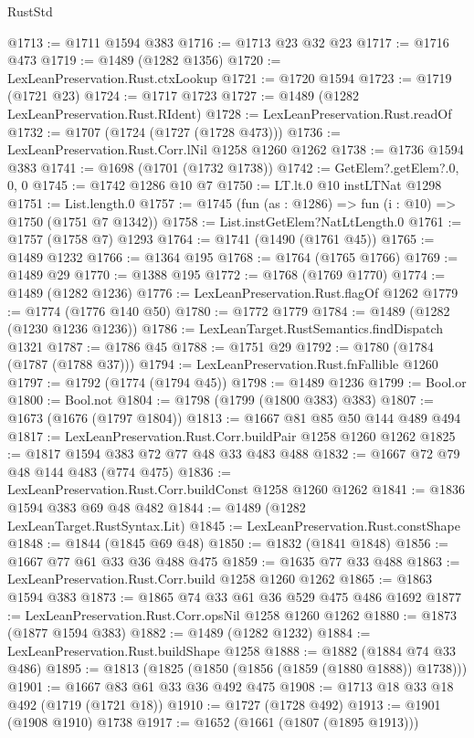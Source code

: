 \begin{lexlean}{RustStd}
\begin{coremodule}
{\begin{coremodule}
{{{{{{{{{{{{@1713 := @1711 @1594 @383
@1716 := @1713 @23 @32 @23
@1717 := @1716 @473
@1719 := @1489 (@1282 @1356)
@1720 := LexLeanPreservation.Rust.ctxLookup
@1721 := @1720 @1594
@1723 := @1719 (@1721 @23)
@1724 := @1717 @1723
@1727 := @1489 (@1282 LexLeanPreservation.Rust.RIdent)
@1728 := LexLeanPreservation.Rust.readOf
@1732 := @1707 (@1724 (@1727 (@1728 @473)))
@1736 := LexLeanPreservation.Rust.Corr.lNil @1258 @1260 @1262
@1738 := @1736 @1594 @383
@1741 := @1698 (@1701 (@1732 @1738))
@1742 := GetElem?.getElem?.{0, 0, 0}
@1745 := @1742 @1286 @10 @7
@1750 := LT.lt.{0} @10 instLTNat @1298
@1751 := List.length.{0}
@1757 := @1745 (fun (as : @1286) => fun (i : @10) => @1750 (@1751 @7 @1342))
@1758 := List.instGetElem?NatLtLength.{0}
@1761 := @1757 (@1758 @7) @1293
@1764 := @1741 (@1490 (@1761 @45))
@1765 := @1489 @1232
@1766 := @1364 @195
@1768 := @1764 (@1765 @1766)
@1769 := @1489 @29
@1770 := @1388 @195
@1772 := @1768 (@1769 @1770)
@1774 := @1489 (@1282 @1236)
@1776 := LexLeanPreservation.Rust.flagOf @1262
@1779 := @1774 (@1776 @140 @50)
@1780 := @1772 @1779
@1784 := @1489 (@1282 (@1230 @1236 @1236))
@1786 := LexLeanTarget.RustSemantics.findDispatch @1321
@1787 := @1786 @45
@1788 := @1751 @29
@1792 := @1780 (@1784 (@1787 (@1788 @37)))
@1794 := LexLeanPreservation.Rust.fnFallible @1260
@1797 := @1792 (@1774 (@1794 @45))
@1798 := @1489 @1236
@1799 := Bool.or
@1800 := Bool.not
@1804 := @1798 (@1799 (@1800 @383) @383)
@1807 := @1673 (@1676 (@1797 @1804))
@1813 := @1667 @81 @85 @50 @144 @489 @494
@1817 := LexLeanPreservation.Rust.Corr.buildPair @1258 @1260 @1262
@1825 := @1817 @1594 @383 @72 @77 @48 @33 @483 @488
@1832 := @1667 @72 @79 @48 @144 @483 (@774 @475)
@1836 := LexLeanPreservation.Rust.Corr.buildConst @1258 @1260 @1262
@1841 := @1836 @1594 @383 @69 @48 @482
@1844 := @1489 (@1282 LexLeanTarget.RustSyntax.Lit)
@1845 := LexLeanPreservation.Rust.constShape
@1848 := @1844 (@1845 @69 @48)
@1850 := @1832 (@1841 @1848)
@1856 := @1667 @77 @61 @33 @36 @488 @475
@1859 := @1635 @77 @33 @488
@1863 := LexLeanPreservation.Rust.Corr.build @1258 @1260 @1262
@1865 := @1863 @1594 @383
@1873 := @1865 @74 @33 @61 @36 @529 @475 @486 @1692
@1877 := LexLeanPreservation.Rust.Corr.opsNil @1258 @1260 @1262
@1880 := @1873 (@1877 @1594 @383)
@1882 := @1489 (@1282 @1232)
@1884 := LexLeanPreservation.Rust.buildShape @1258
@1888 := @1882 (@1884 @74 @33 @486)
@1895 := @1813 (@1825 (@1850 (@1856 (@1859 (@1880 @1888)) @1738)))
@1901 := @1667 @83 @61 @33 @36 @492 @475
@1908 := @1713 @18 @33 @18 @492 (@1719 (@1721 @18))
@1910 := @1727 (@1728 @492)
@1913 := @1901 (@1908 @1910) @1738
@1917 := @1652 (@1661 (@1807 (@1895 @1913)))
}}}}}}}}}}}}
\end{coremodule}}
\end{coremodule}
\end{lexlean}
